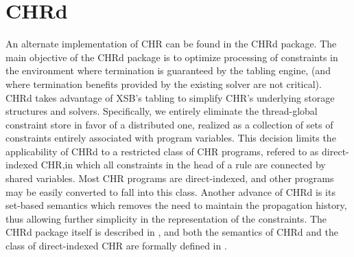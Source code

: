 \section{CHRd}

An alternate implementation of CHR can be found in the CHRd package.
The main objective of the CHRd package is to optimize processing of
constraints in the environment where termination is guaranteed by the
tabling engine, (and where termination benefits provided by the
existing solver are not critical).  CHRd takes advantage of XSB's
tabling to simplify CHR's underlying storage structures and solvers.
Specifically, we entirely eliminate the thread-global constraint store
in favor of a distributed one, realized as a collection of sets of
constraints entirely associated with program variables.  This decision
limits the applicability of CHRd to a restricted class of CHR
programs, refered to as direct-indexed CHR,in which all constraints in
the head of a rule are connected by shared variables.  Most CHR
programs are direct-indexed, and other programs may be easily
converted to fall into this class. Another advance of CHRd is its
set-based semantics which removes the need to maintain the propagation
history, thus allowing further simplicity in the representation of the
constraints.  The CHRd package itself is described in \cite{SaSr06a},
and both the semantics of CHRd and the class of direct-indexed CHR are
formally defined in \cite{SaSR06b}.

